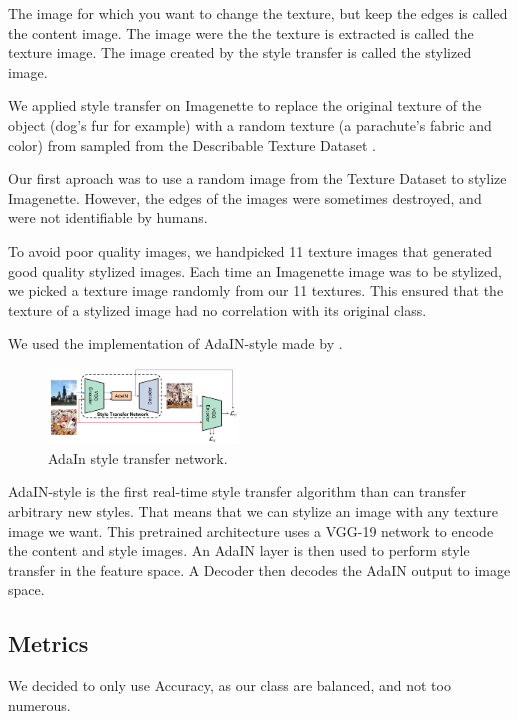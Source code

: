 \documentclass{article}
\begin{document}
\noindent
The image for which you want to change the texture, but keep the edges is called the content image.
The image were the the texture is extracted is called the texture image.
The image created by the style transfer is called the stylized image. \smallskip

\noindent
We applied style transfer on Imagenette to replace the original texture of the object (dog's fur for example) 
with a random texture (a parachute's fabric and color) 
from sampled from the Describable Texture Dataset \cite{cimpoi14describing}. \smallskip

\noindent
Our first aproach was to use a random image from the Texture Dataset to stylize Imagenette. However, 
the edges of the images were sometimes destroyed, and were not identifiable by humans. \smallskip

\noindent
To avoid poor quality images, we handpicked 11 texture images that generated good quality stylized images.
Each time an Imagenette image was to be stylized, we picked a texture image randomly from our 11 textures.
This ensured that the texture of a stylized image had no correlation with its original class. \smallskip

\noindent
We used the implementation of AdaIN-style \cite{huang2017arbitrary} made by \cite{stylizeddatasets2019}.
\begin{figure}[h!]\center
  \includegraphics[width=0.45\textwidth]{imgs/adain_architecture}
  \caption{AdaIn style transfer network.}
\end{figure}

AdaIN-style is the first real-time style transfer algorithm than can transfer arbitrary new styles.
That means that we can stylize an image with any texture image we want.
This pretrained architecture uses a VGG-19 network to encode the content and style images.
An AdaIN layer is then used to perform style transfer in the feature space.   
A Decoder then decodes the AdaIN output to image space.

\subsection{Metrics}

We decided to only use Accuracy, as our class are balanced, and not too numerous.
\end{document}
